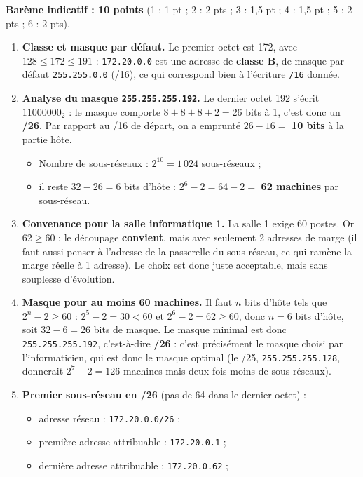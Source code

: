 \documentclass[11pt]{article}
\begin{document}
\begin{corrige}
\textbf{Barème indicatif : 10 points} (1 : 1 pt ; 2 : 2 pts ; 3 : 1,5 pt ; 4 : 1,5 pt ; 5 : 2 pts ; 6 : 2 pts).
\begin{enumerate}
\item \textbf{Classe et masque par défaut.} Le premier octet est 172, avec $128 \leq 172 \leq 191$ : \texttt{172.20.0.0} est une adresse de \textbf{classe B}, de masque par défaut \texttt{255.255.0.0} (/16), ce qui correspond bien à l'écriture \texttt{/16} donnée.
\item \textbf{Analyse du masque \texttt{255.255.255.192}.} Le dernier octet 192 s'écrit $11000000_2$ : le masque comporte $8 + 8 + 8 + 2 = 26$ bits à 1, c'est donc un \textbf{/26}. Par rapport au /16 de départ, on a emprunté $26 - 16 =$ \textbf{10 bits} à la partie hôte.
\begin{itemize}
\item Nombre de sous-réseaux : $2^{10} = 1\,024$ sous-réseaux ;
\item il reste $32 - 26 = 6$ bits d'hôte : $2^6 - 2 = 64 - 2 =$ \textbf{62 machines} par sous-réseau.
\end{itemize}
\item \textbf{Convenance pour la salle informatique 1.} La salle 1 exige 60 postes. Or $62 \geq 60$ : le découpage \textbf{convient}, mais avec seulement 2 adresses de marge (il faut aussi penser à l'adresse de la passerelle du sous-réseau, ce qui ramène la marge réelle à 1 adresse). Le choix est donc juste acceptable, mais sans souplesse d'évolution.
\item \textbf{Masque pour au moins 60 machines.} Il faut $n$ bits d'hôte tels que $2^n - 2 \geq 60$ : $2^5 - 2 = 30 < 60$ et $2^6 - 2 = 62 \geq 60$, donc $n = 6$ bits d'hôte, soit $32 - 6 = 26$ bits de masque. Le masque minimal est donc \texttt{255.255.255.192}, c'est-à-dire \textbf{/26} : c'est précisément le masque choisi par l'informaticien, qui est donc le masque optimal (le /25, \texttt{255.255.255.128}, donnerait $2^7 - 2 = 126$ machines mais deux fois moins de sous-réseaux).
\item \textbf{Premier sous-réseau en /26} (pas de 64 dans le dernier octet) :
\begin{itemize}
\item adresse réseau : \texttt{172.20.0.0/26} ;
\item première adresse attribuable : \texttt{172.20.0.1} ;
\item dernière adresse attribuable : \texttt{172.20.0.62} ;

\end{itemize}
\end{enumerate}
\end{corrige}
\end{document}
